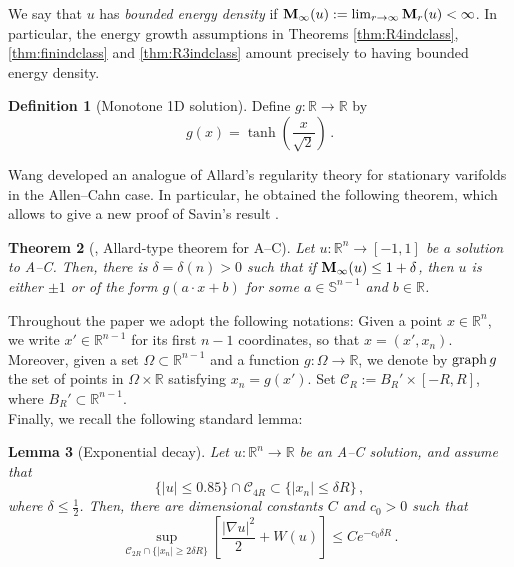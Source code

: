 \documentclass{article}
\newcommand{\R}{\mathbb{R}}
\newcommand{\Sp}{\mathbb{S}}
\newtheorem{theorem}{Theorem}[section]
\newtheorem{lemma}[theorem]{Lemma}
\theoremstyle{definition}
\newtheorem{definition}[theorem]{Definition}
\begin{document}
We say that $u$ has \emph{bounded energy density} if ${\bf M}_\infty(u):=\lim_{r \to \infty} \mathbf{M}_r(u) < \infty$. In particular, the energy growth assumptions in Theorems \ref{thm:R4indclass}, \ref{thm:finindclass} and \ref{thm:R3indclass} amount precisely to having bounded energy density.
\begin{definition}[Monotone 1D solution]
    Define $g:\R\to\R$ by
    \begin{equation}\label{eq:1dsoldef}
        g(x)=\tanh\left(\frac{x}{\sqrt{2}}\right)\,.
    \end{equation}
\end{definition}
Wang developed an analogue of Allard's regularity theory for stationary varifolds in the Allen--Cahn case. In particular, he obtained the following theorem, which allows to give a new proof of Savin's result \cite{Sav09}.
\begin{theorem}[\cite{Wang17}, Allard-type theorem for A--C]\label{thm:ACallard}
    Let $u:\R^n\to [-1,1]$ be a solution to A--C. Then, there is $\delta=\delta(n)>0$ such that if ${\bf M}_\infty(u)\leq 1+\delta$, then $u$ is either $\pm 1$ or of the form $g(a\cdot x+b)$ for some $a\in\Sp^{n-1}$ and $b\in\R$.
\end{theorem}
Throughout the paper we adopt the following notations: Given a point $x \in \mathbb{R}^n$, we write $x' \in \mathbb{R}^{n-1}$ for its first $n-1$ coordinates, so that $x = (x', x_n)$. Moreover, given a set $\Omega \subset \mathbb{R}^{n-1}$ and a function $g : \Omega \to \mathbb{R}$, we denote by ${\rm graph}\, g$ the set of points in $\Omega \times \mathbb{R}$ satisfying $x_n = g(x')$. Set $\mathcal C_R:=B_R'\times [-R,R]$, where $B_R'\subset \R^{n-1}$.\\


Finally, we recall the following standard lemma:
\begin{lemma}[Exponential decay]\label{lem:expdecay}
    Let $u:\R^n\to\R$ be an A--C solution, and assume that
    $$\{|u|\leq 0.85\}\cap \mathcal C_{4R}\subset \{|x_n|\leq \delta R\}\,,$$
    where $\delta \leq \frac{1}{2}$. Then, there are dimensional constants $C$ and $c_0>0$ such that
    \begin{equation}\label{eq:expdecay}
        \sup_{\mathcal C_{2R}\cap\{|x_n|\geq 2\delta R\}}\left[\frac{|\nabla u|^2}{2}+W(u)\right]\leq Ce^{-c_0\delta R}\,.
    \end{equation}
\end{lemma}
\end{document}
